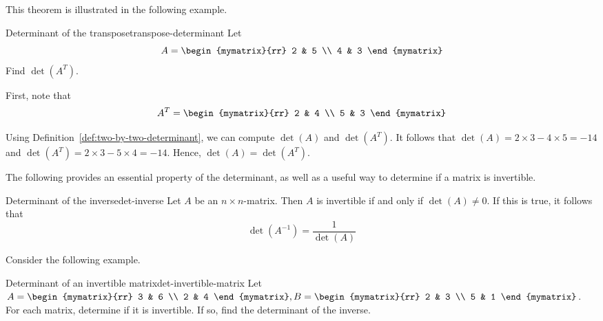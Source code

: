This theorem is illustrated in the following example.

\begin{example}{Determinant of the transpose}{transpose-determinant}
  Let
  \begin{equation*}
    A
    =
    \begin{mymatrix}{rr}
      2 & 5 \\
      4 & 3
    \end{mymatrix}
  \end{equation*}
  Find $\det(A^T)$.
\end{example}

\begin{solution}
  First, note that
  \begin{equation*}
    A^{T}
    =
    \begin{mymatrix}{rr}
      2 & 4 \\
      5 & 3
    \end{mymatrix}
  \end{equation*}

  Using Definition~\ref{def:two-by-two-determinant}, we can compute
  $\det(A)$ and $\det(A^T)$. It follows that
  $\det(A) = 2 \times 3 - 4 \times 5 = -14$ and
  $\det(A^T) = 2 \times 3 - 5 \times 4 = -14$.  Hence,
  $\det(A) = \det(A^T)$.
\end{solution}

The following provides an essential property of the determinant, as
well as a useful way to determine if a matrix is invertible.

\begin{theorem}{Determinant of the inverse}{det-inverse}
  Let $A$ be an $n \times n$-matrix. Then $A$ is invertible if and
  only if $\det(A) \neq 0$. If this is true, it follows that
  \begin{equation*}
    \det(A^{-1}) = \frac{1}{\det(A)}
  \end{equation*}
\end{theorem}

Consider the following example.

\begin{example}{Determinant of an invertible matrix}{det-invertible-matrix}
  Let $A = \begin{mymatrix}{rr}
    3 & 6 \\
    2 & 4
  \end{mymatrix}, B = \begin{mymatrix}{rr}
    2 & 3 \\
    5 & 1
  \end{mymatrix}$. For each matrix, determine if it is invertible. If
  so, find the determinant of the inverse.
\end{example}

